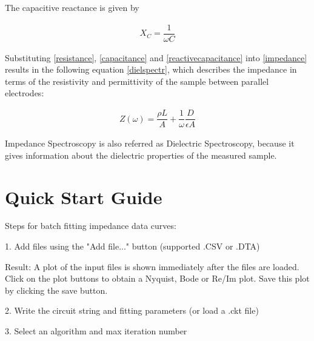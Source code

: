 \documentclass[10pt,b5paper,oneside]{book}
\begin{document}
The capacitive reactance is given by

\begin{align}
X_C = \dfrac{1}{\omega{}C}	\label{reactivecapacitance}
\end{align}

Substituting \eqref{resistance}, \eqref{capacitance} and \eqref{reactivecapacitance} into \eqref{impedance} results in the following equation \eqref{dielspectr}, which describes the impedance in terms of the resistivity and permittivity of the sample between parallel electrodes:

\begin{align}
Z(\omega) = \dfrac{\rho L}{A} + \dfrac{1}{\omega} \dfrac{D}{\epsilon A} \label{dielspectr}
\end{align}

Impedance Spectroscopy is also referred as Dielectric Spectroscopy, because it gives information about the dielectric properties of the measured sample.

%
%
%
%
%

\chapter{Quick Start Guide}

Steps for batch fitting impedance data curves:

1. Add files using the "Add file..." button (supported .CSV or .DTA)

Result: A plot of the input files is shown immediately after the files are loaded. Click on the plot buttons to obtain a Nyquist, Bode or Re/Im plot. Save this plot by clicking the save button.

2. Write the circuit string and fitting parameters (or load a .ckt file)

3. Select an algorithm and max iteration number
\end{document}
